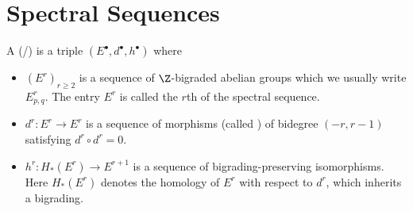 \section{Spectral Sequences}
\begin{definition}
	A (/)  is a triple $(E^\bullet, d^\bullet, h^\bullet)$ where
	\begin{itemize}
		\item $(E^r)_{r \geq 2}$ is a sequence of $\Z$-bigraded abelian groups which we usually write $E^r_{p, q}$.
			The entry $E^r$ is called the $r$th  of the spectral sequence.
		\item $d^r\colon E^r \to E^r$ is a sequence of morphisms (called ) of bidegree $(-r, r - 1)$ satisfying $d^r \circ d^r = 0$.
		\item $h^r\colon H_*(E^r) \to E^{r + 1}$ is a sequence of bigrading-preserving isomorphisms.
			Here $H_*(E^r)$ denotes the homology of $E^r$ with respect to $d^r$, which inherits a bigrading.
	\end{itemize}
\end{definition}
